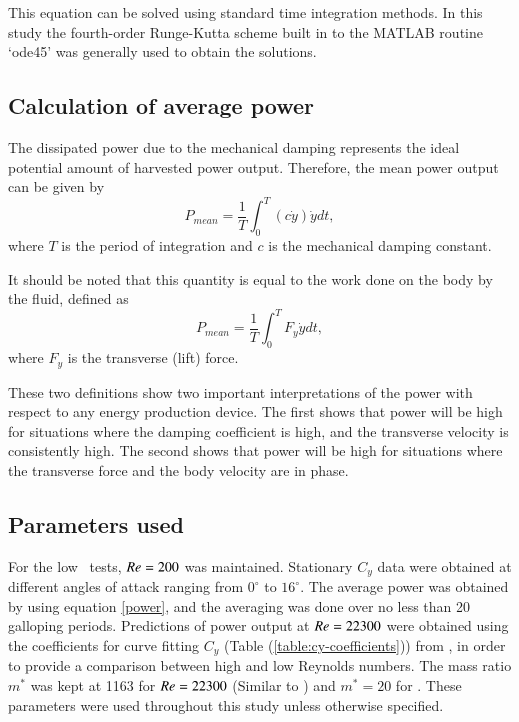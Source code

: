 This equation can be solved using standard time integration methods. In this study the fourth-order Runge-Kutta scheme built in to the MATLAB routine `ode45' was generally used to obtain the solutions. 

\subsection{Calculation of average power}

 The dissipated power due to the mechanical damping represents the ideal potential amount of harvested power output. Therefore, the mean power output can be given by
\begin{equation}
\label{power}
P_{mean}=\frac{1}{T}\int_{0}^{T}(c\dot{y})\dot{y} dt,
\end{equation}
where $T$ is the period of integration and $c$ is the mechanical damping constant. 

It should be noted that this quantity is equal to the work done on the body by the fluid, defined as
\begin{equation}
\label{power_alt}
P_{mean}=\frac{1}{T}\int_{0}^{T}F_y\dot{y} dt,
\end{equation}
where $F_y$ is the transverse (lift) force.

  These two definitions show two important interpretations of the power with respect to any energy production device. The first shows that power will be high for situations where the damping coefficient is high, and the transverse velocity is consistently high. The second shows that power will be high for situations where the transverse force and the body velocity are in phase.
 
 

 
 
 \subsection{Parameters used} 
  
 For the low \reynoldsnumber\ tests, $Re=200$ was maintained. Stationary $C_y$ data were obtained at different angles of attack ranging from $0^\circ$ to $16^\circ$. The average power was obtained by using equation \ref{power}, and the averaging was done over no less than 20 galloping periods. Predictions of power output at $Re=22300$ were obtained using the coefficients for curve fitting $C_y$ (Table (\ref{table:cy-coefficients})) from \citet{Parkinson1964}, in order to provide a comparison between high and low Reynolds numbers. The mass ratio $m^*$ was kept at 1163 for $Re=22300$ (Similar to \citet{Parkinson1964}) and $m^*=20$ for . These parameters were used throughout this study unless otherwise specified. 
 
